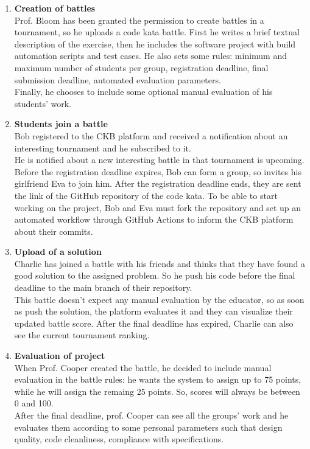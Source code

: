 \begin{enumerate}
    \item \textbf{Creation of battles} \\
    Prof. Bloom has been granted the permission to create battles in a tournament, so he uploads a 
    code kata battle. First he writes a brief textual description of the exercise, then he includes 
    the software project with build automation scripts and test cases. He also sets some rules:
    minimum and maximum number of students per group, registration deadline, final submission deadline, 
    automated evaluation parameters.\\
    Finally, he chooses to include some optional manual evaluation of his students' work.\\
    \item \textbf{Students join a battle} \\
    Bob registered to the CKB platform and received a notification about an interesting tournament 
    and he subscribed to it. 
    \\He is notified about a new interesting battle in that tournament is upcoming. Before the registration 
    deadline expires, Bob can form a group, so invites his girlfriend Eva to join him. After the registration
     deadline ends, they are sent the link of the GitHub repository of the code kata. To be able to start 
     working on the project, Bob and Eva must fork the repository and set up an automated workflow through
     GitHub Actions to inform the CKB platform about their commits.\\

    \item \textbf{Upload of a solution} \\
    Charlie has joined a battle with his friends and thinks that they have found a good solution to 
    the assigned problem. So he push his code before the final deadline to the main branch of their
    repository. \\This battle doesn't expect any manual evaluation by the educator, so as soon as 
    push the solution, the platform evaluates it and they can visualize their updated battle score.
    After the final deadline has expired, Charlie can also see the current tournament ranking. \\

    \item \textbf{Evaluation of project}\\
    When Prof. Cooper created the battle, he decided to include manual evaluation in the battle rules:
    he wants the system to assign up to 75 points, while he will assign the remaing 25 points. 
    So, scores will always be between 0 and 100.\\
    After the final deadline, prof. Cooper can see all the groups' work and he evaluates them according
    to some personal parameters such that design quality, code cleanliness, compliance with specifications.\\


\end{enumerate}
